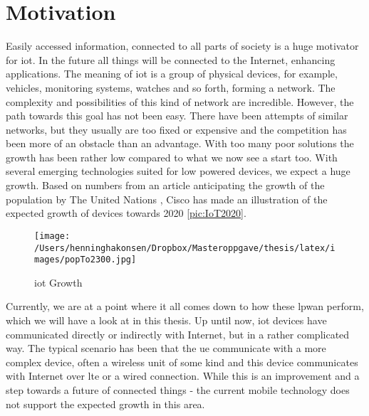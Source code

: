 \documentclass[USenglish]{ifimaster}  %
\begin{document}
\section{Motivation}
Easily accessed information, connected to all parts of society is a huge motivator for \acrfull{iot}. In the future all things will be connected to the Internet, enhancing applications. The meaning of \acrshort{iot} is a group of physical devices, for example, vehicles, monitoring systems, watches and so forth, forming a network. The complexity and possibilities of this kind of network are incredible. However, the path towards this goal has not been easy. There have been attempts of similar networks, but they usually are too fixed or expensive and the competition has been more of an obstacle than an advantage. With too many poor solutions the growth has been rather low compared to what we now see a start too. With several emerging technologies suited for low powered devices, we expect a huge growth. Based on numbers from an article anticipating the growth of the population by The United Nations \cite{online:pop2300}, Cisco has made an illustration of the expected growth of devices towards 2020 \vref{pic:IoT2020}.

\begin{figure}[ht]
  \centering\texttt{[image: /Users/henninghakonsen/Dropbox/Masteroppgave/thesis/latex/images/popTo2300.jpg]}
  \caption[\acrshort{iot} Growth]{\acrshort{iot} Growth \cite{online:IoT2020}}
  \label{pic:IoT2020}
\end{figure}

Currently, we are at a point where it all comes down to how these \acrshort{lpwan} perform, which we will have a look at in this thesis. Up until now, \acrshort{iot} devices have communicated directly or indirectly with Internet, but in a rather complicated way. The typical scenario has been that the \acrfull{ue} communicate with a more complex device, often a wireless unit of some kind and this device communicates with Internet over \acrshort{lte} or a wired connection. While this is an improvement and a step towards a future of connected things - the current mobile technology does not support the expected growth in this area.
\end{document}
